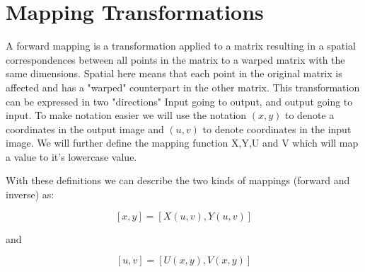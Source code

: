 \section{Mapping Transformations}

A forward mapping is a transformation applied to a matrix resulting in a
spatial correspondences between all points in the matrix to a warped
matrix with the same dimensions. Spatial here means that each point in the
original matrix is affected and has a "warped" counterpart in the other
matrix. This transformation can be expressed in two "directions" Input going
to output, and output going to input. 
To make notation easier we will use the notation $(x,y)$ to denote a
coordinates in the output image and $(u,v)$ to denote coordinates in the input
image. We will further define the mapping function X,Y,U and V which will map a
value to it's lowercase value. 

With these definitions we can describe the two kinds of mappings (forward and
inverse) as:

$$[x, y] = [X (u,v),Y(u, v)]$$

and

$$[u,v] = [U(x, y),V (x, y)]$$
